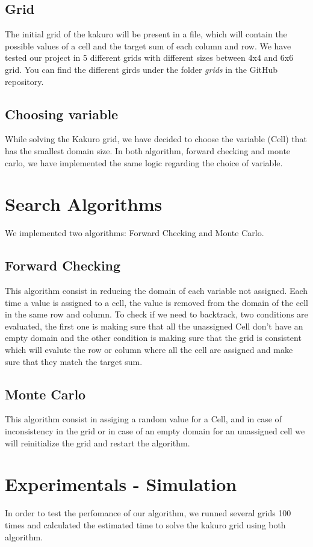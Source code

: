 \documentclass[journal, a4paper]{IEEEtran}
\begin{document}
\subsection{Grid}
The initial grid of the kakuro will be present in a file, which will contain the possible values of a cell and the target sum of each column and row. We have tested our project in 5 different grids with different sizes between 4x4 and 6x6 grid. You can find the different girds under the folder \textit{grids} in the GitHub repository.

\subsection{Choosing variable}
While solving the Kakuro grid, we have decided to choose the variable (Cell) that has the smallest domain size. In both algorithm, forward checking and monte carlo, we have implemented the same logic regarding the choice of variable.

\section{Search Algorithms}
We implemented two algorithms: Forward Checking and Monte Carlo.
\subsection{Forward Checking}
This algorithm consist in reducing the domain of each variable not assigned. Each time a value is assigned to a cell, the value is removed from the domain of the cell in the same row and column. To check if we need to backtrack, two conditions are evaluated, the first one is making sure that all the unassigned Cell don't have an empty domain and the other condition is making sure that the grid is consistent which will evalute the row or column where all the cell are assigned and make sure that they match the target sum.

\subsection{Monte Carlo}
This algorithm consist in assiging a random value for a Cell, and in case of inconsistency in the grid or in case of an empty domain for an unassigned cell we will reinitialize the grid and restart the algorithm. 

\section{Experimentals - Simulation}
In order to test the perfomance of our algorithm, we runned several grids 100 times and calculated the estimated time to solve the kakuro grid using both algorithm. 
\end{document}

